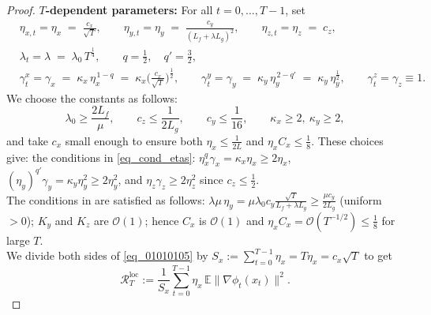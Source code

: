 \documentclass{uai2026} %
\newcommand{\EE}{\mathbb{E}}
\begin{document}
\begin{proof}
\textbf{$T$-dependent parameters:}
For all $t=0,\dots,T-1$, set
\begin{align}
&\eta_{x,t}=\eta_x \;=\; \frac{c_x}{\sqrt{T}},\qquad 
\eta_{y,t}=\eta_y \;=\; \frac{c_y}{(L_f+\lambda L_g)^{2}},\qquad
\eta_{z,t}=\eta_z \;=\; c_z,\\[2pt]
&\lambda_{t}=\lambda \;=\; \lambda_0\,T^{\frac{1}{4}},\qquad
q=\tfrac{1}{2},\quad q'=\tfrac{3}{2},\\[2pt]
&\gamma_{t}^{x}=\gamma_x \;=\; \kappa_x\,\eta_x^{\,1-q}
\;=\; \kappa_x\Big(\tfrac{c_x}{\sqrt{T}}\Big)^{\!\frac12},\qquad
\gamma_{t}^{y}=\gamma_y \;=\; \kappa_y\,\eta_y^{\,2-q'} 
\;=\; \kappa_y\,\eta_y^{\frac12},\qquad
\gamma_{t}^{z}=\gamma_z \equiv 1.
\end{align}
We choose the constants as follows:
$$
\lambda_0 \ge \frac{2L_f}{\mu},\qquad
c_z \le \frac{1}{2L_g},\qquad
c_y \le \frac{1}{16},\qquad
\kappa_x\ge 2,\ \kappa_y\ge 2,
$$
and take $c_x$ small enough to ensure both $\eta_x\le \tfrac{1}{2L}$ and $\eta_x C_x\le \tfrac18$.
These choices give: the conditions in \eqref{eq_cond_etas}:
  $\eta_x^q\gamma_x=\kappa_x\eta_x\ge 2\eta_x$, $(\eta_y)^{q'}\gamma_y=\kappa_y\eta_y^2\ge2\eta_y^2$, and $\eta_z\gamma_z\ge 2\eta_z^2$ since $c_z\le \tfrac12$.\\
  The conditions in  are satisfied as follows:
  $\lambda\mu\,\eta_y=\mu \lambda_0 c_y\frac{\sqrt{T}}{L_f+\lambda L_g}\ge \frac{\mu c_y}{2L_g}$ (uniform $>0$); $K_y$ and $K_z$ are $\mathcal{O}(1)$; hence $C_x$ is $\mathcal{O}(1)$ and $\eta_xC_x=\mathcal{O}(T^{-1/2})\le\tfrac18$ for large $T$.\\

  We divide both sides of \eqref{eq_01010105} by $S_x:=\sum_{t=0}^{T-1}\eta_x = T\eta_x = c_x\sqrt{T}$ to get
\[
\mathcal{R}^{\mathrm{loc}}_T
:= \frac{1}{S_x}\sum_{t=0}^{T-1}\eta_x\,\EE\|\nabla\phi_t(x_t)\|^2.
\]


\end{proof}
\end{document}
